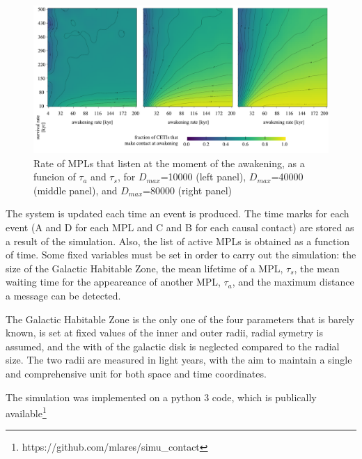 \documentclass[crop]{CSLB}%
\begin{document}
  
\begin{figure} %
   \centering
   \includegraphics[width=\textwidth]{matrix_2.pdf}
   \caption{Rate of MPLs that listen at the moment of the
   awakening, as a funcion of $\tau_a$ and $\tau_s$, for
   $D_{max}$=10000 (left panel),
   $D_{max}$=40000 (middle panel), and
   $D_{max}$=80000 (right panel)}
   \label{F_C_at_A}
\end{figure}
                         

The system is updated each time an event is produced.
%
The time marks for each event (A and D for each MPL and C and B for each causal
contact) are stored as a result of the simulation.
%
Also, the list of active MPLs is obtained as a function of time.
%
Some fixed variables must be set in order to carry out the simulation: the size
of the Galactic Habitable Zone, the mean lifetime of a MPL, $\tau_s$, the mean
waiting time for the appeareance of another MPL, $\tau_a$, and the maximum
distance a message can be detected.



The Galactic Habitable Zone is the only one of the four parameters that is
barely known, is set at fixed values of the inner and outer radii, radial
symetry is assumed, and the with of the galactic disk is neglected compared to
the radial size.
%
The two radii are measured in light years, with the aim to maintain a single and
comprehensive unit for both space and time coordinates. 

The simulation was implemented on a python 3 code, which is publically
available\footnote{https://github.com/mlares/simu\_contact}



                   
\end{document}
